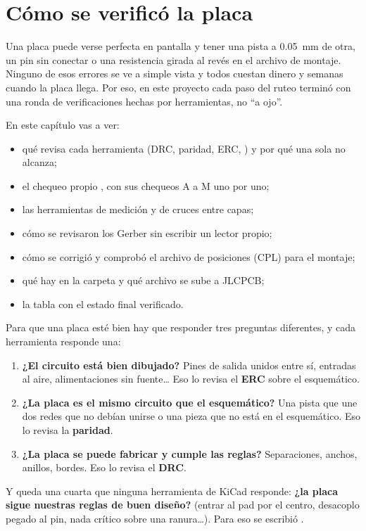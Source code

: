 \chapter{Cómo se verificó la placa}\label{cap:verif}

Una placa puede verse perfecta en pantalla y tener una pista a \SI{0.05}{\milli\meter} de otra, un pin sin conectar
o una resistencia girada al revés en el archivo de montaje. Ninguno de esos errores se ve a simple vista y todos
cuestan dinero y semanas cuando la placa llega. Por eso, en este proyecto cada paso del ruteo terminó con una ronda de
verificaciones hechas por herramientas, no ``a ojo''.

En este capítulo vas a ver:
\begin{itemize}
  \item qué revisa cada herramienta (DRC, paridad, ERC, ) y por qué una sola no alcanza;
  \item el chequeo propio , con sus chequeos A a M uno por uno;
  \item las herramientas de medición y de cruces entre capas;
  \item cómo se revisaron los Gerber sin escribir un lector propio;
  \item cómo se corrigió y comprobó el archivo de posiciones (CPL) para el montaje;
  \item qué hay en la carpeta  y qué archivo se sube a JLCPCB;
  \item la tabla con el estado final verificado.
\end{itemize}

\begin{idea}
Para que una placa esté bien hay que responder tres preguntas diferentes, y cada herramienta responde una:
\begin{enumerate}
  \item \textbf{¿El circuito está bien dibujado?} Pines de salida unidos entre sí, entradas al aire, alimentaciones
  sin fuente\ldots{} Eso lo revisa el \textbf{ERC} sobre el esquemático.
  \item \textbf{¿La placa es el mismo circuito que el esquemático?} Una pista que une dos redes que no debían unirse
  o una pieza que no está en el esquemático. Eso lo revisa la \textbf{paridad}.
  \item \textbf{¿La placa se puede fabricar y cumple las reglas?} Separaciones, anchos, anillos, bordes. Eso lo revisa
  el \textbf{DRC}.
\end{enumerate}
Y queda una cuarta que ninguna herramienta de KiCad responde: \textbf{¿la placa sigue nuestras reglas de buen
diseño?} (entrar al pad por el centro, desacoplo pegado al pin, nada crítico sobre una ranura\ldots). Para eso se
escribió .
\end{idea}

